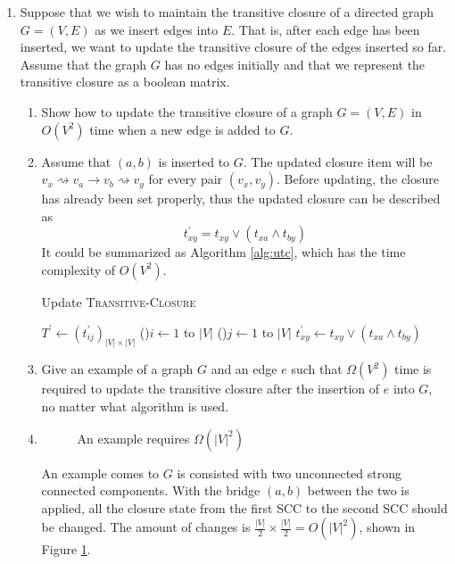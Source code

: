 \documentclass[12pt,a4paper]{article}
\makeatletter
\newtheorem*{solution}{Solution}
\theoremstyle{definition}
\renewenvironment{solution}[1][Solution] {\par\pushQED{\qed}\normalfont\topsep6\p@\@plus6\p@\relax\trivlist\item[\hskip\labelsep\bfseries#1\@addpunct{.}]\ignorespaces}{\popQED\endtrivlist\@endpefalse} \makeatother
\makeatother
\begin{document}
\begin{enumerate}
	\item Suppose that we wish to maintain the transitive closure of a directed graph $G=(V,E)$ as we insert edges into $E$. That is, after each edge has been inserted, we want to update the transitive closure of the edges inserted so far. Assume that the graph $G$ has no edges initially and that we represent the transitive closure as a boolean matrix.
	\begin{enumerate}
	    \item Show how to update the transitive closure of a graph $G=(V,E)$ in $O(V^2)$ time when a new edge is added to $G$.
		\begin{solution}
			Assume that $(a,b)$ is inserted to $G$. The updated closure item will be $v_x\rightsquigarrow v_a \rightarrow v_b\rightsquigarrow v_y$ for every pair $(v_x,v_y)$. Before updating, the closure has already been set properly, thus the updated closure can be described as
			\begin{equation*}
				t_{xy}^\prime = t_{xy} \vee(t_{xa}\land t_{by})
			\end{equation*}
			It could be summarized as Algorithm \ref{alg:utc}, which has the time complexity of $O(V^2)$.
			\begin{algorithm}[h]
				\caption{Update \textsc{Transitive-Closure}}
				\label{alg:utc}
				\BlankLine
				$T^\prime\leftarrow (t_{ij}^\prime)_{|V|\times|V|}$\;
				\For(){$i\leftarrow 1$ to $|V|$}{
					\ForEach(){$j\leftarrow 1$ to $|V|$}{
						$t_{xy}^\prime \leftarrow t_{xy} \vee(t_{xa}\land t_{by})$\;
					}
				}
				\;
			\end{algorithm}
		\end{solution}
	    \item Give an example of a graph $G$ and an edge $e$ such that $\Omega(V^2)$ time is required to update the transitive closure after the insertion of $e$ into $G$, no matter what algorithm is used.
	    \begin{solution}
			\begin{figure}[h]
				\centering
				
				\caption{An example requires $\Omega(|V|^2)$}
				\label{fig:eg}
			\end{figure}
			An example comes to $G$ is consisted with two unconnected strong connected components. With the bridge $(a,b)$ between the two is applied, all the closure state from the first SCC to the second SCC should be changed. The amount of changes is $\frac{|V|}{2}\times\frac{|V|}{2}=O(|V|^2)$, shown in Figure \ref{fig:eg}.

\end{solution}
\end{enumerate}
\end{enumerate}
\end{document}
